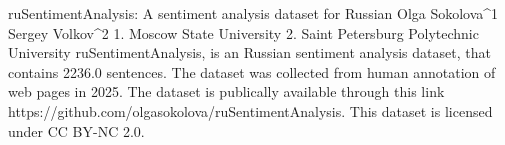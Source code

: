 
ruSentimentAnalysis: A sentiment analysis dataset for Russian
Olga Sokolova^1 Sergey Volkov^2
1. Moscow State University 2. Saint Petersburg Polytechnic University
ruSentimentAnalysis, is an Russian sentiment analysis dataset, that contains 2236.0 sentences.
The dataset was collected from human annotation of web pages in 2025. 
The dataset is publically available through this link https://github.com/olgasokolova/ruSentimentAnalysis. This dataset is licensed under CC BY-NC 2.0.


